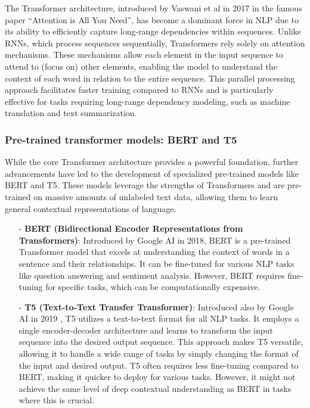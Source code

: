 \documentclass[12.5pt]{article}
\begin{document}
The Transformer architecture, introduced by Vaswani et al \cite{Vaswani2017} in 2017 in the famous paper “Attention is All You Need”, has become a dominant force in NLP due to its ability to efficiently capture long-range dependencies within sequences. Unlike RNNs, which process sequences sequentially, Transformers rely solely on attention mechanisms. These mechanisms allow each element in the input sequence to attend to (focus on) other elements, enabling the model to understand the context of each word in relation to the entire sequence. This parallel processing approach facilitates faster training compared to RNNs and is particularly effective for tasks requiring long-range dependency modeling, such as machine translation and text summarization.

\subsubsection{Pre-trained transformer models: BERT and T5}

While the core Transformer architecture provides a powerful foundation, further advancements have led to the development of specialized pre-trained models like BERT and T5. These models leverage the strengths of Transformers and are pre-trained on massive amounts of unlabeled text data, allowing them to learn general contextual representations of language.

\begin{enumerate}
    \item[-] \textbf{BERT (Bidirectional Encoder Representations from Transformers)}: Introduced by Google AI \cite{devlin2018} in 2018, BERT is a pre-trained Transformer model that excels at understanding the context of words in a sentence and their relationships. It can be fine-tuned for various NLP tasks like question answering and sentiment analysis. However, BERT requires fine-tuning for specific tasks, which can be computationally expensive.
    \item[-] \textbf{T5 (Text-to-Text Transfer Transformer)}: Introduced also by Google AI in 2019 \cite{Raffel2019}, T5 utilizes a text-to-text format for all NLP tasks. It employs a single encoder-decoder architecture and learns to transform the input sequence into the desired output sequence. This approach makes T5 versatile, allowing it to handle a wide range of tasks by simply changing the format of the input and desired output. T5 often requires less fine-tuning compared to BERT, making it quicker to deploy for various tasks. However, it might not achieve the same level of deep contextual understanding as BERT in tasks where this is crucial.
\end{enumerate}
\end{document}
